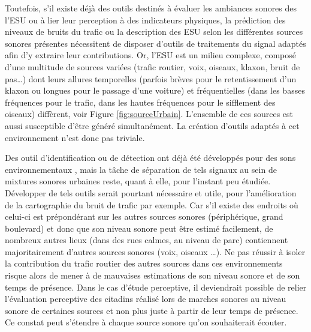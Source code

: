 Toutefois, s'il existe déjà des outils destinés à évaluer les ambiances sonores des l'ESU ou à lier leur perception à des indicateurs physiques, la prédiction des niveaux de bruits du trafic ou la description des ESU selon les différentes sources sonores présentes nécessitent de disposer d'outils de traitements du signal adaptés afin d'y extraire leur contributions. 
Or, l'ESU est un milieu complexe, composé d'une multitude de sources variées (trafic routier, voix, oiseaux, klaxon, bruit de pas\dots) dont leurs allures temporelles (parfois brèves pour le retentissement d'un klaxon ou longues pour le passage d'une voiture) et fréquentielles (dans les basses fréquences pour le trafic, dans les hautes fréquences pour le sifflement des oiseaux) diffèrent, voir Figure \ref{fig:sourceUrbain}.
L'ensemble de ces sources est aussi susceptible d'être généré simultanément. La création d'outils adaptés à cet environnement n'est donc pas triviale.

Des outil d'identification ou de détection ont déjà été  développés pour des sons environnementaux \cite{mesaros_sound_2015, chachada2014environmental, cakir2015polyphonic}, mais la tâche de séparation de tels signaux au sein de mixtures sonores urbaines reste, quant à elle, pour l'instant peu étudiée. 
Développer de tels outils serait pourtant nécessaire et utile, pour l'amélioration de la cartographie du bruit de trafic par exemple. Car s'il existe des endroits où celui-ci est prépondérant sur les autres sources sonores (périphérique, grand boulevard) et donc que son niveau sonore peut être estimé facilement, de nombreux autres lieux (dans des rues calmes, au niveau de parc) contiennent majoritairement d'autres sources sonores (voix, oiseaux \dots). Ne pas réussir à isoler la contribution du trafic routier des autres sources dans ces environnements risque alors de mener à de mauvaises estimations de son niveau sonore et de son temps de présence. Dans le cas d'étude perceptive, il deviendrait possible de relier l'évaluation perceptive des citadins réalisé lors de marches sonores au niveau sonore de certaines sources et non plus juste à partir de leur temps de présence. Ce constat peut s'étendre à chaque source sonore qu'on souhaiterait écouter.\\

